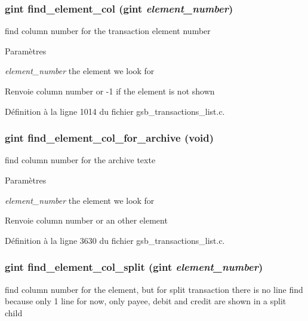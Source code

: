 \subsubsection[{find\_\-element\_\-col}]{\setlength{\rightskip}{0pt plus 5cm}gint find\_\-element\_\-col (gint {\em element\_\-number})}\label{gsb__transactions__list_8c_a8be7f66c4c8f7c67eb187290c18fb6f7}
find column number for the transaction element number


\begin{DoxyParams}{Paramètres}
\item[{\em element\_\-number}]the element we look for\end{DoxyParams}
\begin{DoxyReturn}{Renvoie}
column number or -\/1 if the element is not shown 
\end{DoxyReturn}


Définition à la ligne 1014 du fichier gsb\_\-transactions\_\-list.c.

\subsubsection[{find\_\-element\_\-col\_\-for\_\-archive}]{\setlength{\rightskip}{0pt plus 5cm}gint find\_\-element\_\-col\_\-for\_\-archive (void)}\label{gsb__transactions__list_8c_aa2d81179288c9dd410d36fc58c9a9ca4}
find column number for the archive texte


\begin{DoxyParams}{Paramètres}
\item[{\em element\_\-number}]the element we look for\end{DoxyParams}
\begin{DoxyReturn}{Renvoie}
column number or an other element 
\end{DoxyReturn}


Définition à la ligne 3630 du fichier gsb\_\-transactions\_\-list.c.

\subsubsection[{find\_\-element\_\-col\_\-split}]{\setlength{\rightskip}{0pt plus 5cm}gint find\_\-element\_\-col\_\-split (gint {\em element\_\-number})}\label{gsb__transactions__list_8c_aa33a589932f8d657a321fd0bb5a4447f}
find column number for the element, but for split transaction there is no line find because only 1 line for now, only payee, debit and credit are shown in a split child


